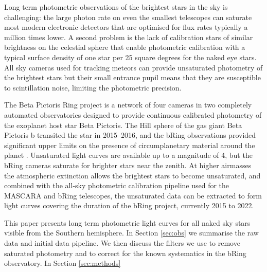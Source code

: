 \documentclass{aa}
\begin{document}
Long term photometric observations of the brightest stars in the sky is challenging: the large photon rate on even the smallest telescopes can saturate most modern electronic detectors that are optimised for flux rates typically a million times lower.
%
A second problem is the lack of calibration stars of similar brightness on the celestial sphere that enable photometric calibration with a typical surface density of one star per 25 square degrees for the naked eye stars.
%
All sky cameras used for tracking meteors can provide unsaturated photometry of the brightest stars but their small entrance pupil means that they are susceptible to scintillation noise, limiting the photometric precision.

The Beta Pictoris Ring \citep[bRing; ][]{Stuik_2014} project is a network of four cameras in two completely automated observatories designed to provide continuous calibrated photometry of the exoplanet host star Beta Pictoris.
%
The Hill sphere of the gas giant Beta Pictoris b transited the star in 2015--2016, and the bRing observations provided significant upper limits on the presence of circumplanetary material around the planet \citep{Kenworthy21}.
%
Unsaturated light curves are available up to a magnitude of 4, but the bRing cameras saturate for brighter stars near the zenith.
%
At higher airmasses the atmospheric extinction allows the brightest stars to become unsaturated, and combined with the all-sky photometric calibration pipeline used for the MASCARA and bRing telescopes, the unsaturated data can be extracted to form light curves covering the duration of the bRing project, currently 2015 to 2022.

This paper presents long term photometric light curves for all naked sky stars visible from the Southern hemisphere.
%
In Section \ref{sec:obs} we summarise the raw data and initial data pipeline.
%
We then discuss the filters we use to remove saturated photometry and to correct for the known systematics in the bRing observatory.
%
In Section \ref{sec:methods}

\end{document}
